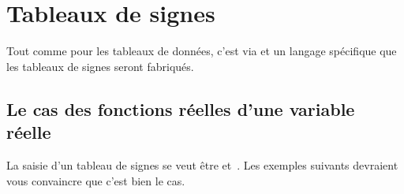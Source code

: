 \documentclass[10pt, a4paper]{tutodoc}
\begin{document}
\section{Tableaux de signes}

\begin{tdocnote}
	Tout comme pour les tableaux de données, c'est via  et un langage spécifique que les tableaux de signes seront fabriqués.
\end{tdocnote}




\subsection{Le cas des fonctions réelles d'une variable réelle}

La saisie d'un tableau de signes se veut être  et \,. Les exemples suivants devraient vous convaincre que c'est bien le cas.
\end{document}
